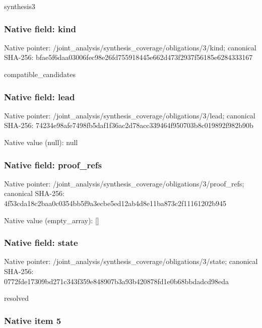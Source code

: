 \documentclass[10pt,a4paper]{article}
\begin{document}
synthesis3


\subsubsection{Native field: kind}


Native pointer: /joint\_analysis/synthesi\allowbreak{}s\_coverage/obligations/3\allowbreak{}/kind; canonical SHA-256: bfae5f6daa03006fec98e26f\allowbreak{}d755918445e662d473f2937f\allowbreak{}56185e6284333167


compatible\_candidates


\subsubsection{Native field: lead}


Native pointer: /joint\_analysis/synthesi\allowbreak{}s\_coverage/obligations/3\allowbreak{}/lead; canonical SHA-256: 74234e98afe7498fb5daf1f3\allowbreak{}6ac2d78acc339464f950703b\allowbreak{}8c019892f982b90b



Native value (null): null



\subsubsection{Native field: proof\_refs}


Native pointer: /joint\_analysis/synthesi\allowbreak{}s\_coverage/obligations/3\allowbreak{}/proof\_refs; canonical SHA-256: 4f53cda18c2baa0c0354bb5f\allowbreak{}9a3ecbe5ed12ab4d8e11ba87\allowbreak{}3c2f11161202b945



Native value (empty\_array): []



\subsubsection{Native field: state}


Native pointer: /joint\_analysis/synthesi\allowbreak{}s\_coverage/obligations/3\allowbreak{}/state; canonical SHA-256: 0772fde17309bd271c343f35\allowbreak{}9e848907b3a93b420878fd1e\allowbreak{}0b68bbdadcd98eda


resolved


\subsubsection{Native item 5}
\end{document}
